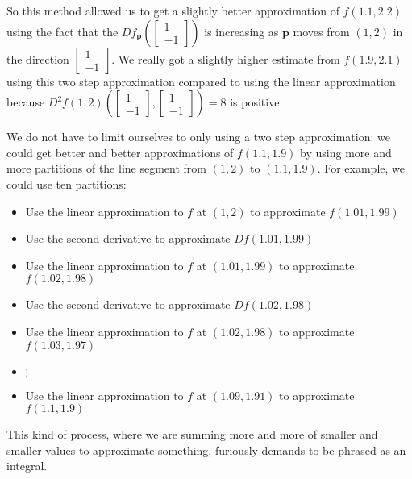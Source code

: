 \documentclass{article}
\newcommand{\verticalvector}[1]{\begin{bmatrix}#1\end{bmatrix}}
\newenvironment{question}{}{}
\begin{document}
\begin{question}
  So this method allowed us to get a slightly better approximation of $f(1.1,2.2)$ using the fact that the $Df_{\mathbf{p}}(\verticalvector{1\\-1})$ is increasing
  as $\mathbf{p}$ moves from $(1,2)$ in the direction $\verticalvector{1\\-1}$.  We really got a slightly higher estimate from $f(1.9,2.1)$ using this two step
  approximation compared to using the linear approximation because 
  $D^2f(1,2)\left(\verticalvector{1\\-1},\verticalvector{1\\-1} \right) = 8$ is positive.  
  
  We do not have to limit ourselves to only using a two step approximation:  we could get better and better approximations of $f(1.1,1.9)$
  by using more and more partitions of the line segment from $(1,2)$ to $(1.1,1.9)$.  For example, we could use ten partitions:
  \begin{itemize}
  \item Use the linear approximation to $f$ at $(1,2)$ to approximate $f(1.01,1.99)$
  \item Use the second derivative to approximate $Df(1.01,1.99)$
  \item Use the linear approximation to $f$ at $(1.01,1.99)$ to approximate $f(1.02,1.98)$
  \item Use the second derivative to approximate $Df(1.02,1.98)$
  \item Use the linear approximation to $f$ at $(1.02,1.98)$ to approximate $f(1.03,1.97)$
  \item $\vdots$
  \item  Use the linear approximation to $f$ at $(1.09,1.91)$ to approximate $f(1.1,1.9)$
  \end{itemize}
  
  This kind of process, where we are summing more and more of smaller and smaller values to approximate something, 
  furiously demands to be phrased as an integral.
  

\end{question}
\end{document}
